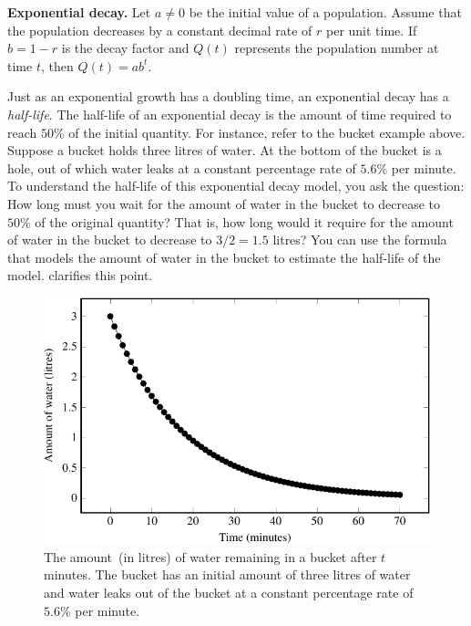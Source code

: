 \documentclass[a4paper,oneside,12pt]{article}
\begin{document}
\begin{theorem}
\label{thm:exponential_decay}
\textbf{Exponential decay.}
Let $a \neq 0$ be the initial value of a population.  Assume that the
population decreases by a constant decimal rate of $r$ per unit time.
If $b = 1 - r$ is the decay factor and $Q(t)$ represents the
population number at time $t$, then $Q(t) = ab^t$.
\end{theorem}

Just as an exponential growth has a doubling time, an exponential
decay has a \emph{half-life}.  The half-life of an exponential decay
is the amount of time required to reach $50\%$ of the initial
quantity.  For instance, refer to the bucket example above.  Suppose a
bucket holds three litres of water.  At the bottom of the bucket is a
hole, out of which water leaks at a constant percentage rate of
$5.6\%$ per minute.  To understand the half-life of this exponential
decay model, you ask the question:  How long must you wait for the
amount of water in the bucket to decrease to $50\%$ of the original
quantity?  That is, how long would it require for the amount of water
in the bucket to decrease to $3 / 2 = 1.5$ litres?  You can use the
formula that models the amount of water in the bucket to estimate the
half-life of the model.   clarifies this
point.

\begin{figure}[!htbp]
\centering
\includegraphics[scale=1.1]{image/11/water.pdf}
\caption{%
  The amount~(in litres) of water remaining in a bucket after $t$
  minutes.  The bucket has an initial amount of three litres of water
  and water leaks out of the bucket at a constant percentage rate of
  $5.6\%$ per minute.
}
\label{fig:bucket_water_level}
\end{figure}
\end{document}
